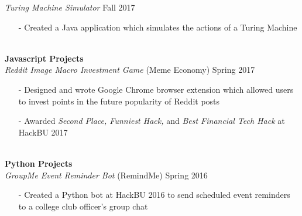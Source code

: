 \documentclass[11pt]{article}
\newcommand{\Indent}{\indent\indent}
\begin{document}
            \Indent \small\textit{Turing Machine Simulator} \hfill \small{Fall 2017}\indent\\
                \Indent\begin{minipage}{\dimexpr\textwidth-6cm}
                    \begin{itemize}[noitemsep, topsep=0pt]
                        \item[-] Created a Java application which simulates the actions of a Turing Machine
                    \end{itemize}\vspace{0mm}
                \end{minipage}\\
        \indent \small\textbf{Javascript Projects}\\
            \Indent \small\textit{Reddit Image Macro Investment Game}\small{ (Meme Economy)} \hfill \small{Spring 2017}\indent\vspace{0.5mm}\\
                \Indent\begin{minipage}{\dimexpr\textwidth-6cm}
                    \begin{itemize}[noitemsep, topsep=0pt]
                        \item[-] Designed and wrote Google Chrome browser extension which allowed users to invest points in the future popularity of Reddit posts
                        \item[-] Awarded \textit{Second Place, Funniest Hack,} and \textit{Best Financial Tech Hack} at HackBU 2017
                    \end{itemize}\vspace{0mm}
                \end{minipage}\\
        \indent \small\textbf{Python Projects}\\
            \Indent \small\textit{GroupMe Event Reminder Bot}\small{ (RemindMe)} \hfill \small{Spring 2016}\indent\vspace{0.5mm}\\
                \Indent\begin{minipage}{\dimexpr\textwidth-6cm}
                    \begin{itemize}[noitemsep, topsep=0pt]
                        \item[-] Created a Python bot at HackBU 2016 to send scheduled event reminders to a college club officer's group chat
                    \end{itemize}\vspace{0mm}
                \end{minipage}
\end{document}
